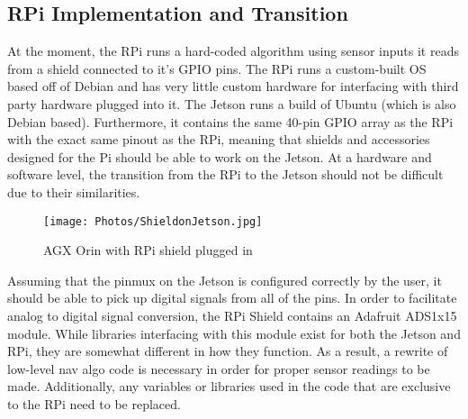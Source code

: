 \documentclass{article}
\begin{document}
\subsection{RPi Implementation and Transition}
At the moment, the RPi runs a hard-coded algorithm using sensor inputs it reads from a shield connected to it's GPIO pins. The RPi runs a custom-built OS based off of Debian and has very little custom hardware for interfacing with third party hardware plugged into it.
\newline
\indent The Jetson runs a build of Ubuntu (which is also Debian based). Furthermore, it contains the same 40-pin GPIO array as the RPi with the exact same pinout as the RPi, meaning that shields and accessories designed for the Pi should be able to work on the Jetson. At a hardware and software level, the transition from the RPi to the Jetson should not be difficult due to their similarities.
\begin{figure}[htp]
    \centering
    \texttt{[image: Photos/ShieldonJetson.jpg]}
    \caption{AGX Orin with RPi shield plugged in}
    \label{fig:Photos/ShieldonJetson.jpg}
\end{figure}
\newline
\indent Assuming that the pinmux on the Jetson is configured correctly by the user, it should be able to pick up digital signals from all of the pins. In order to facilitate analog to digital signal conversion, the RPi Shield contains an Adafruit ADS1x15 module. While libraries interfacing with this module exist for both the Jetson and RPi, they are somewhat different in how they function. As a result, a rewrite of low-level nav algo code is necessary in order for proper sensor readings to be made. Additionally, any variables or libraries used in the code that are exclusive to the RPi need to be replaced.
\end{document}
